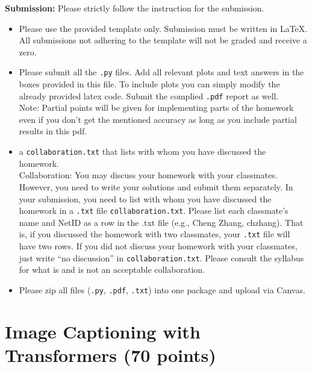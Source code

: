 \documentclass{article}
\begin{document}
\noindent \textbf{Submission:} Please strictly follow the instruction for the submission.
\begin{itemize}
    \item Please use the provided template only. Submission must be written in LaTeX. All submissions not adhering to the template will not be graded and receive a zero.
    \item Please submit all the \texttt{.py} files. Add all relevant plots and text answers in the boxes provided in this file. To include plots you can simply modify the already provided latex code. Submit the complied \texttt{.pdf} report as well.\\

    Note: Partial points will be given for implementing parts of the homework even if you don’t get the mentioned accuracy as long as you include partial results in this pdf.

    \item a \texttt{collaboration.txt} that lists with whom you have discussed the homework. \\

    Collaboration: You may discuss your homework with your classmates. However, you need to write your solutions and submit them separately. In your submission, you need to list with whom you have discussed the homework in a \texttt{.txt} file \texttt{collaboration.txt}. Please list each classmate’s name and NetID as a row in the .txt file (e.g., Cheng Zhang, chzhang). That is, if you discussed the homework with two classmates, your \texttt{.txt} file will have two rows. If you did not discuss your homework with your classmates, just write ``no discussion'' in \texttt{collaboration.txt}. Please consult the syllabus for what is and is not an acceptable collaboration.

    \item Please zip all files (\texttt{.py}, \texttt{.pdf}, \texttt{.txt}) into one package and upload via Canvas. 

    
\end{itemize}

\section{Image Captioning with Transformers (70 points)}
\end{document}
